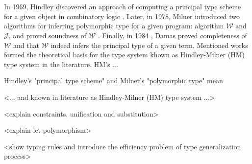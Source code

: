 \chapter{}
\label{chap:lr}



\section{}

In 1969, Hindley discovered an approach of computing a principal type scheme for a given object in combinatory logic \cite{Hindley1969_PrincipalTypeScheme}. Later, in 1978, Milner introduced two algorithms for inferring polymorphic type for a given program: algorithm $\mathcal{W}$ and $\mathcal{J}$, and proved soundness of $\mathcal{W}$ \cite{Milner1978_TypePolymorphism}. Finally, in 1984 \cite{Damas1984_TypeAssignment}, Damas proved completeness of $\mathcal{W}$ and that $\mathcal{W}$ indeed infers the principal type of a given term. Mentioned works formed the theoretical basis for the type system khown as Hindley-Milner (HM) type system in the literature. HM's ...

Hindley's "principal type scheme" and Milner's "polymorphic type" mean 

<... and known in literature as Hindley-Milner (HM) type system ...>

<explain constraints, unification and substitution>

<explain let-polymorphism>

<show typing rules and introduce the efficiency problem of type generalization process>

